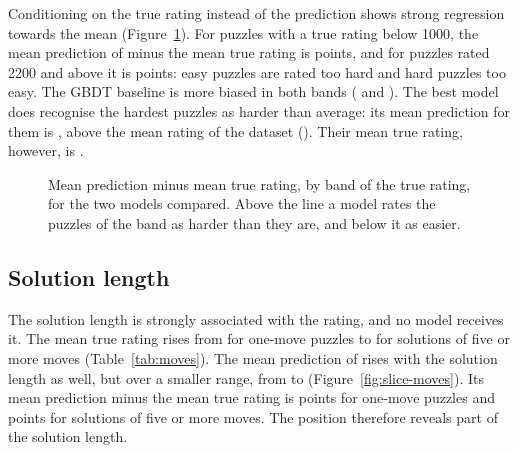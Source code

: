 \documentclass[11pt]{article}
\begin{document}
Conditioning on the true rating instead of the prediction shows strong
regression towards the mean (Figure~\ref{fig:band-bias}). For puzzles with a
true rating below 1000, the mean prediction of  minus the
mean true rating is  points, and for
puzzles rated 2200 and above it is 
points: easy puzzles are rated too hard and hard puzzles too easy. The GBDT
baseline is more biased in both bands ( and
). The best model does recognise the
hardest puzzles as harder than average: its mean prediction for them is
, above the mean rating of the dataset
(). Their mean true rating, however, is
.

\begin{figure}[htbp]\centering
{}
\caption{Mean prediction minus mean true rating, by band of the true rating,
for the two models compared. Above the line a model rates the puzzles of the
band as harder than they are, and below it as easier.}
\label{fig:band-bias}
\end{figure}

\subsection{Solution length}

The solution length is strongly associated with the rating, and no model
receives it. The mean true rating rises from
 for one-move puzzles to
 for solutions of five or more moves
(Table~\ref{tab:moves}). The mean prediction of  rises
with the solution length as well, but over a smaller range, from
 to 
(Figure~\ref{fig:slice-moves}). Its mean prediction minus the mean true
rating is  points for one-move puzzles and
 points for solutions of five or more
moves. The position therefore reveals part of the solution length.

\begin{table}[htbp]\centering\footnotesize
{}
\caption{Test-set results by solution length, which no model receives. For
each group: the number of test puzzles, the mean true rating, the mean
prediction and RMSE of each of the two models, and the paired gain of the
first model over the second.}
\label{tab:moves}
\end{table}
\end{document}
